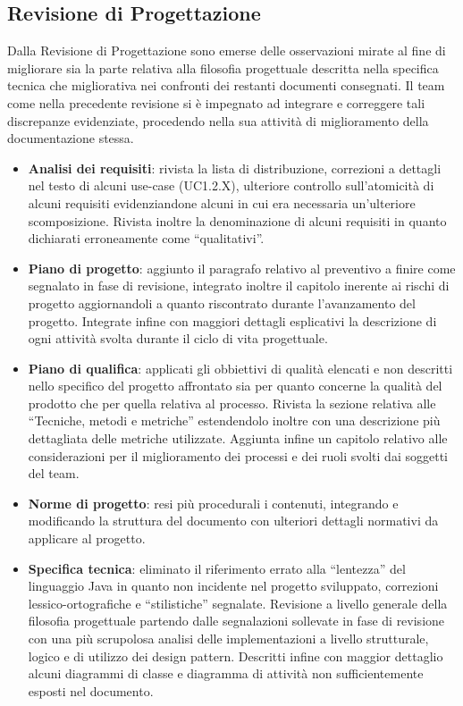 \subsection{Revisione di Progettazione}
Dalla Revisione di Progettazione sono emerse delle osservazioni mirate al fine di migliorare sia la parte relativa alla filosofia progettuale descritta nella specifica tecnica che migliorativa nei confronti dei restanti documenti consegnati. Il team come nella precedente revisione si è impegnato ad integrare e correggere tali discrepanze evidenziate, procedendo nella sua attività di miglioramento della documentazione stessa.

\begin{itemize}
\item \textbf{Analisi dei requisiti}: rivista la lista di distribuzione, correzioni a dettagli nel testo di alcuni use-case (UC1.2.X), ulteriore controllo sull'atomicità di alcuni requisiti evidenziandone alcuni in cui era necessaria un'ulteriore scomposizione. Rivista inoltre la denominazione di alcuni requisiti in quanto dichiarati erroneamente come ``qualitativi''.

\item \textbf{Piano di progetto}: aggiunto il paragrafo relativo al preventivo a finire come segnalato in fase di revisione, integrato inoltre il capitolo inerente ai rischi di progetto aggiornandoli a quanto riscontrato durante l'avanzamento del progetto. Integrate infine con maggiori dettagli esplicativi la descrizione di ogni attività svolta durante il ciclo di vita progettuale.

\item \textbf{Piano di qualifica}: applicati gli obbiettivi di qualità elencati e non descritti nello specifico del progetto affrontato sia per quanto concerne la qualità del prodotto che per quella relativa al processo. Rivista la sezione relativa alle ``Tecniche, metodi e metriche'' estendendolo inoltre con una descrizione più dettagliata delle metriche utilizzate. Aggiunta infine un capitolo relativo alle considerazioni per il miglioramento dei processi e dei ruoli svolti dai soggetti del team.

\item \textbf{Norme di progetto}: resi più procedurali i contenuti, integrando e modificando la struttura del documento con ulteriori dettagli normativi da applicare al progetto.

\item \textbf{Specifica tecnica}: eliminato il riferimento errato alla ``lentezza'' del linguaggio Java in quanto non incidente nel progetto sviluppato, correzioni lessico-ortografiche e ``stilistiche'' segnalate. Revisione a livello generale della filosofia progettuale partendo dalle segnalazioni sollevate in fase di revisione con una più scrupolosa analisi delle implementazioni a livello strutturale, logico e di utilizzo dei design pattern. Descritti infine con maggior dettaglio alcuni diagrammi di classe e diagramma di attività non sufficientemente esposti nel documento.
\end{itemize}

